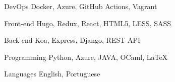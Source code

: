 

\begin{cvskills}

  \cvskill
    {DevOps} %
    {Docker, Azure, GitHub Actions, Vagrant} %
    
      \cvskill
        {Front-end} %
        {Hugo, Redux, React, HTML5, LESS, SASS} %

  \cvskill
    {Back-end} %
    {Koa, Express, Django, REST API} %

  \cvskill
    {Programming} %
    {Python, Azure, JAVA, OCaml, LaTeX} %

  \cvskill
    {Languages} %
    {English, Portuguese} %

\end{cvskills}
